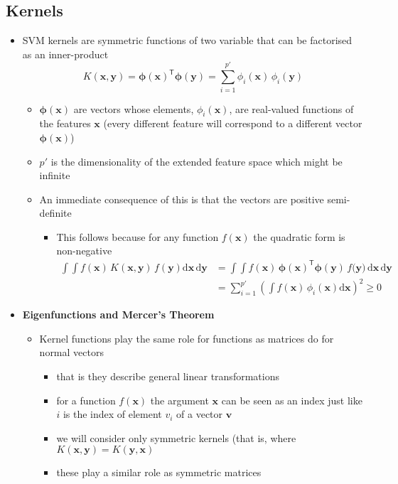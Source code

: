 \documentclass[11pt]{article}
\newcommand{\tr}{\textsf{T}}
\newcommand{\dd}{\mathrm{d}}
\begin{document}
\subsection{Kernels}
\label{sec:org2bafab7}
\begin{itemize}
\item SVM kernels are symmetric functions of two variable that can be
factorised as an inner-product
$$  K(\bm{x},\bm{y}) = \bm{\phi}(\bm{x})^\tr\bm{\phi}(\bm{y}) =
     \sum_{i=1}^{p'} \phi_i(\bm{x})\,\phi_i(\bm{y})$$
\begin{itemize}
\item \(\bm{\phi}(\bm{x})\) are vectors whose elements,
\(\phi_i(\bm{x})\), are real-valued functions of
the features \(\bm{x}\) (every different feature will correspond
to a different vector \(\bm{\phi}(\bm{x})\))
\item \(p'\) is the dimensionality of the extended feature space which
might be infinite
\item An immediate consequence of this is that the vectors are
positive semi-definite
\begin{itemize}
\item This follows because for any function \(f(\bm{x})\) the
quadratic form is non-negative 
\begin{align*}
\int\!\! \int f(\bm{x})\,K(\bm{x},\bm{y}) \, f(\bm{y}) \dd \bm{x}\, \dd \bm{y}
&= \int\!\! \int f(\bm{x})\, \bm{\phi}(\bm{x})^\tr\bm{\phi}(\bm{y})\, f(\bm{y)}\, \dd \bm{x}\, \dd \bm{y}\\
&=\sum_{i=1}^{p'}  \left(\int f(\bm{x})\, \phi_i(\bm{x}) \dd
\bm{x}\right)^2 \geq 0
\end{align*}
\end{itemize}
\end{itemize}
\item \textbf{Eigenfunctions and Mercer's Theorem}
\begin{itemize}
\item Kernel functions play the same role for functions as matrices
do for normal vectors
\begin{itemize}
\item that is they describe general linear transformations
\item for a function \(f(\bm{x})\) the argument \(\bm{x}\) can be seen
as an index just like \(i\) is the index of element \(v_i\) of a
vector \(\bm{v}\)
\item we will consider only symmetric kernels (that is, where
\(K(\bm{x},\bm{y})=K(\bm{y},\bm{x})\)
\item these play a similar role as symmetric matrices

\end{itemize}
\end{itemize}
\end{itemize}
\end{document}
